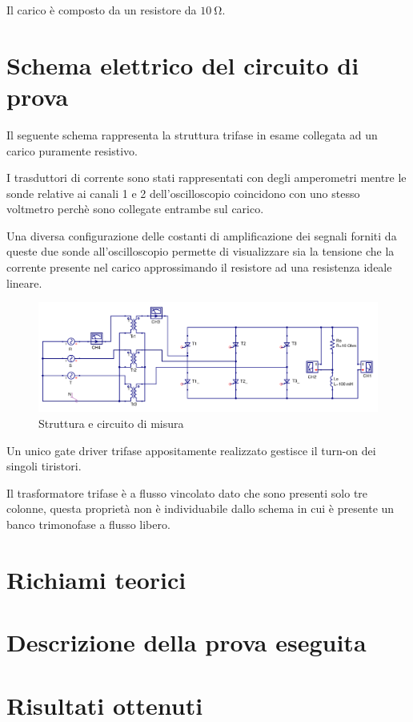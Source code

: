 \documentclass[a4paper,10pt]{article}
\begin{document}
Il carico è composto da un resistore da $\SI{10}{\ohm}$.



\section{Schema elettrico del circuito di prova}
Il seguente schema rappresenta la struttura trifase in esame collegata ad un
carico puramente resistivo.

I trasduttori di corrente sono stati rappresentati con degli
amperometri mentre le sonde relative ai canali 1 e 2 dell'oscilloscopio
coincidono con uno stesso voltmetro perchè sono collegate entrambe sul carico.

Una diversa configurazione delle costanti di amplificazione dei segnali forniti 
da queste due sonde all'oscilloscopio permette di visualizzare sia la tensione 
che la corrente presente nel carico approssimando il resistore ad una resistenza 
ideale lineare.


\begin{figure}[H]
 \centering
 \includegraphics[keepaspectratio=true,width=1\linewidth]{img/circuito_qucs.png}
 \caption{Struttura e circuito di misura}
 \label{fig:circuito}
\end{figure}

Un unico gate driver trifase appositamente realizzato gestisce il turn-on
dei singoli tiristori.

Il trasformatore trifase è a flusso vincolato dato che sono presenti 
solo tre colonne, questa proprietà non è individuabile dallo schema in cui 
è presente un banco trimonofase a flusso libero.

\section{Richiami teorici}


\section{Descrizione della prova eseguita}

\section{Risultati ottenuti}
\end{document}
